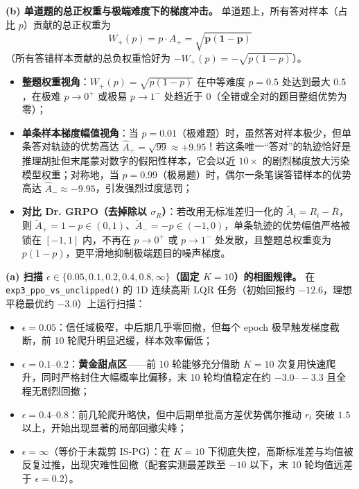 \textbf{(b) 单道题的总正权重与极端难度下的梯度冲击。} 单道题上，所有答对样本（占比 $p$）贡献的总正权重为
\[
  W_+(p) = p \cdot \hat{A}_+ = \mathbf{\sqrt{p(1 - p)}}
\]
（所有答错样本贡献的总负权重恰好为 $-W_+(p) = -\sqrt{p(1-p)}$）。
\begin{itemize}
  \item \textbf{整题权重视角}：$W_+(p) = \sqrt{p(1-p)}$ 在中等难度 $p = 0.5$ 处达到最大 $0.5$，在极难 $p \to 0^+$ 或极易 $p \to 1^-$ 处趋近于 $0$（全错或全对的题目整组优势为零）；
  \item \textbf{单条样本梯度幅值视角}：当 $p = 0.01$（极难题）时，虽然答对样本极少，但单条答对轨迹的优势高达 $\hat{A}_+ = \sqrt{99} \approx \mathbf{+9.95}$！若这条唯一“答对”的轨迹恰好是推理胡扯但末尾蒙对数字的假阳性样本，它会以近 $10\times$ 的剧烈梯度放大污染模型权重；对称地，当 $p = 0.99$（极易题）时，偶尔一条笔误答错样本的优势高达 $\hat{A}_- \approx \mathbf{-9.95}$，引发强烈过度惩罚；
  \item \textbf{对比 Dr. GRPO（去掉除以 $\sigma_R$）}：若改用无标准差归一化的 $\tilde{A}_i = R_i - \bar{R}$，则 $\tilde{A}_+ = 1 - p \in (0, 1)$、$\tilde{A}_- = -p \in (-1, 0)$，单条轨迹的优势幅值严格被锁在 $[-1, 1]$ 内，不再在 $p \to 0^+$ 或 $p \to 1^-$ 处发散，且整题总权重变为 $p(1 - p)$，更平滑地抑制极端题目的噪声梯度。
\end{itemize}


\textbf{(a) 扫描 $\epsilon \in \{0.05, 0.1, 0.2, 0.4, 0.8, \infty\}$（固定 $K = 10$）的相图规律。} 在 \texttt{exp3\_ppo\_vs\_unclipped()} 的 1D 连续高斯 LQR 任务（初始回报约 $-12.6$，理想平稳最优约 $-3.0$）上运行扫描：
\begin{itemize}
  \item $\epsilon = 0.05$：信任域极窄，中后期几乎零回撤，但每个 epoch 极早触发梯度截断，前 10 轮爬升明显迟缓，样本效率偏低；
  \item $\epsilon = 0.1\text{--}0.2$：\textbf{黄金甜点区}——前 10 轮能够充分借助 $K = 10$ 次复用快速爬升，同时严格封住大幅概率比偏移，末 10 轮均值稳定在约 $-3.0\text{--}-3.3$ 且全程无剧烈回撤；
  \item $\epsilon = 0.4\text{--}0.8$：前几轮爬升略快，但中后期单批高方差优势偶尔推动 $r_t$ 突破 $1.5$ 以上，开始出现显著的局部回撤尖峰；
  \item $\epsilon = \infty$（等价于未裁剪 IS-PG）：在 $K = 10$ 下彻底失控，高斯标准差与均值被反复过推，出现灾难性回撤（配套实测最差跌至 $-10$ 以下，末 10 轮均值远差于 $\epsilon = 0.2$）。
\end{itemize}

